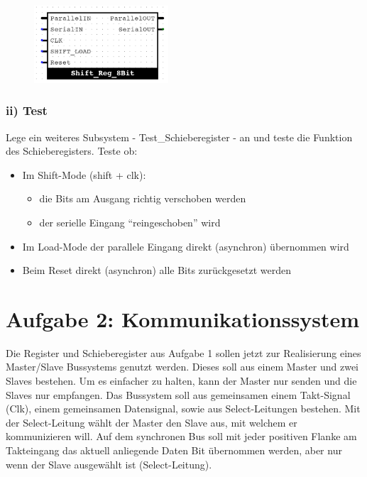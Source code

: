\documentclass[a4paper]{scrartcl}
\begin{document}
\begin{figure}[h]
  \centering
  \includegraphics[width=5cm]{ShiftReg.png}
\end{figure}

\subsubsection*{ii) Test}
Lege ein weiteres Subsystem - Test\_Schieberegister - an und teste die Funktion des Schieberegisters.
Teste ob:
\begin{itemize}
  \item Im Shift-Mode (shift + clk):
  \begin{itemize}
    \item die Bits am Ausgang richtig verschoben werden
    \item der serielle Eingang ``reingeschoben'' wird
  \end{itemize} 
  \item Im Load-Mode der parallele Eingang direkt (asynchron) übernommen wird
  \item Beim Reset direkt (asynchron) alle Bits zurückgesetzt werden
\end{itemize}

\section*{Aufgabe 2: Kommunikationssystem}
Die Register und Schieberegister aus Aufgabe 1 sollen jetzt zur Realisierung eines Master/Slave Bussystems genutzt werden. Dieses soll aus einem Master 
und zwei Slaves bestehen. Um es einfacher zu halten, kann der Master nur senden und die Slaves nur empfangen. Das Bussystem soll aus gemeinsamen
einem Takt-Signal (Clk),
einem gemeinsamen Datensignal, sowie aus Select-Leitungen bestehen. Mit der Select-Leitung wählt der Master den Slave aus, mit welchem er kommunizieren will.
Auf dem synchronen Bus soll mit jeder positiven Flanke am Takteingang das aktuell anliegende Daten Bit übernommen werden, aber nur wenn der Slave ausgewählt ist
(Select-Leitung).
\end{document}
